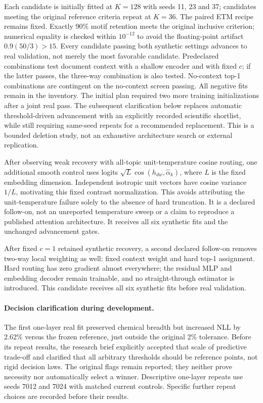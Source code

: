 \documentclass[10pt,a4paper]{article}
\begin{document}
Each candidate is initially fitted at $K=128$ with seeds 11, 23 and 37;
candidates meeting the original reference criteria repeat at $K=36$.
The paired ETM recipe remains fixed. Exactly 90\% motif retention meets the
original inclusive criterion; numerical equality is checked
within $10^{-12}$ to avoid the floating-point artifact
$0.9(50/3)>15$. Every candidate passing both synthetic settings advances to
real validation, not merely the most favorable candidate. Predeclared
combinations test document context with a shallow encoder and with fixed $c$;
if the latter passes, the three-way combination is also tested. No-context
top-1 combinations are contingent on the no-context screen passing. All
negative fits remain in the inventory. The initial plan required two more
training initializations after a joint real pass. The subsequent clarification
below replaces automatic threshold-driven advancement with an explicitly
recorded scientific shortlist, while still requiring same-seed repeats for a
recommended replacement. This is a bounded deletion study, not an exhaustive
architecture search or external replication.

After observing weak recovery with all-topic unit-temperature cosine routing,
one additional smooth control uses logits $\sqrt{L}\cos(h_{dw},\widehat\alpha_k)$,
where $L$ is the fixed embedding dimension. Independent isotropic unit vectors
have cosine variance $1/L$, motivating this fixed contrast normalization.
This avoids attributing the unit-temperature failure solely to the absence of
hard truncation. It is a declared follow-on, not an unreported temperature
sweep or a claim to reproduce a published attention architecture. It receives
all six synthetic fits and the unchanged advancement gates.

After fixed $c=1$ retained synthetic recovery, a second declared follow-on
removes two-way local weighting as well: fixed context weight and hard top-1
assignment. Hard routing has zero gradient almost everywhere; the residual
MLP and embedding decoder remain trainable, and no straight-through estimator
is introduced. This candidate receives all six synthetic fits before real
validation.

\paragraph{Decision clarification during development.}
The first one-layer real fit preserved chemical breadth but increased NLL by
2.62\% versus the frozen reference, just outside the original 2\% tolerance.
Before its repeat results, the research brief explicitly accepted that scale
of predictive trade-off and clarified that all arbitrary thresholds should
be reference points, not rigid decision laws. The original flags remain
reported; they neither prove necessity nor automatically select a winner.
Descriptive one-layer repeats use seeds 7012 and 7024 with matched current
controls. Specific further repeat choices are recorded before their results.
\end{document}
